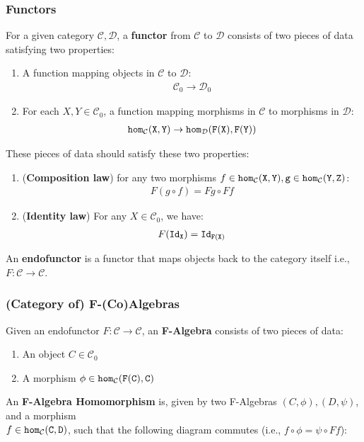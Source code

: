 \subsubsection{Functors}
For a given category $\mathcal{C}, \mathcal{D}$, a \textbf{functor} from $\mathcal{C}$ to $\mathcal{D}$ consists of two pieces of data satisfying two properties:
\begin{enumerate}
    \item A function mapping objects in $\mathcal{C}$ to $\mathcal{D}$: \begin{align*} \mathcal{C}_0 \to \mathcal{D}_0 \end{align*}
    \item For each $X,Y\in\mathcal{C}_0$, a function mapping morphisms in $\mathcal{C}$ to morphisms in $\mathcal{D}$: \begin{align*} \tt{hom}_\mathcal{C}(X,Y) \to \tt{hom}_\mathcal{D}(F(X),F(Y)) \end{align*}
\end{enumerate}
These pieces of data should satisfy these two properties:
\begin{enumerate}
    \item (\textbf{Composition law}) for any two morphisms $f\in\tt{hom}_\mathcal{C}(X,Y),g\in\tt{hom}_\mathcal{C}(Y,Z)$: \begin{align*} F(g\circ f) = F g \circ F f \end{align*}
    \item (\textbf{Identity law}) For any $X\in\mathcal{C}_0$, we have: \begin{align*} F(\tt{Id}_X) = \tt{Id}_{F(X)} \end{align*}
\end{enumerate}
An \textbf{endofunctor} is a functor that maps objects back to the category itself i.e., $F:\mathcal{C}\to\mathcal{C}$.

\subsubsection{(Category of) F-(Co)Algebras}
Given an endofunctor $F:\mathcal{C}\to\mathcal{C}$, an \textbf{F-Algebra} consists of two pieces of data:
\begin{enumerate}
    \item An object $C\in \mathcal{C}_0$
    \item A morphism $\phi\in\tt{hom}_\mathcal{C}(F(C),C)$
\end{enumerate}

An \textbf{F-Algebra Homomorphism} is, given by two F-Algebras $(C,\phi),(D,\psi)$, and a morphism\\ $f\in\tt{hom}_\mathcal{C}(C,D)$, such that the following diagram commutes (i.e., $f\circ\phi=\psi\circ Ff$):
\begin{figure}[H]\vspace{-1em}\hfill
{}\hfill\null
\end{figure}\vspace{-1em}

